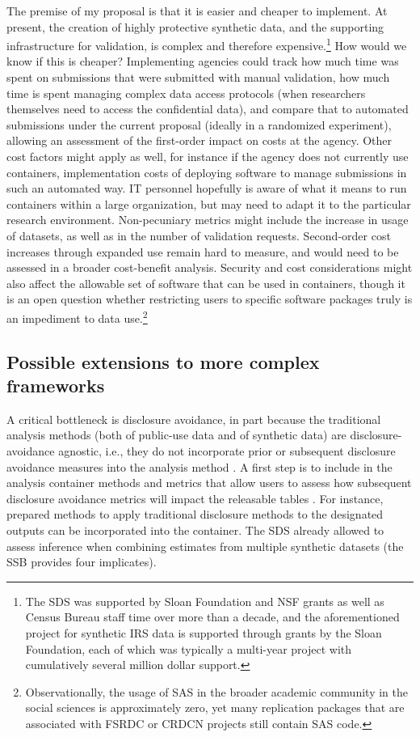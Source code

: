 \documentclass[inline]{hdsr}
\begin{document}
The premise of my proposal is that it is easier and cheaper to implement. At present, the creation of highly protective synthetic data, and the supporting infrastructure for validation, is complex and therefore expensive.\footnote{The \ac{SDS} was supported by Sloan Foundation and \ac{NSF} grants as well as Census Bureau staff time over more than a decade, and the aforementioned project for synthetic IRS data is supported through grants by the Sloan Foundation, each of which was typically a multi-year project with cumulatively several million dollar support.} How would we know if this is cheaper? Implementing  agencies could track how much time was spent on submissions that were submitted with manual validation, how much time is spent managing complex data access protocols (when researchers themselves need to access the confidential data), and compare that to automated submissions under the current proposal (ideally in a randomized experiment),  allowing an assessment of the first-order impact on costs at the agency. Other cost factors might apply as well, for instance if the agency does not currently use containers, implementation costs of deploying software to manage submissions in such an automated way. IT personnel hopefully is aware of what it means to run containers within a large organization, but may need to adapt it to the particular research environment.  Non-pecuniary metrics might include the increase in usage of datasets, as well as in the number of validation requests. Second-order cost increases through expanded use remain hard to measure, and would need to be assessed in a broader cost-benefit analysis. Security and cost considerations might also affect the allowable set of software that can be used in containers, though it is an open question whether restricting users to specific software packages truly is an impediment to data use.\footnote{Observationally, the usage of SAS in the broader academic community in the social sciences is approximately zero, yet many replication packages that are associated with \ac{FSRDC} or \ac{CRDCN} projects still contain SAS code.}

\subsection{Possible extensions to more complex frameworks}

A critical bottleneck is disclosure avoidance, in part because the traditional analysis methods (both of public-use data and of synthetic data) are disclosure-avoidance agnostic, i.e., they do not incorporate prior or subsequent disclosure avoidance measures into the analysis method \citep{AbowdSchmutte_BPEA2015}. A first step is to include in the analysis container methods and metrics that allow users to assess how subsequent disclosure avoidance metrics will impact the releasable tables \citep{ReiterJPC2010}. For instance, prepared methods to apply traditional disclosure methods to the designated outputs \citep[aggregation, suppression, rounding, see][]{brandt_guidelines_2010} can be incorporated into the container. The \ac{SDS} already allowed to assess inference when combining estimates from multiple synthetic datasets (the \ac{SSB} provides four implicates). 
\end{document}
